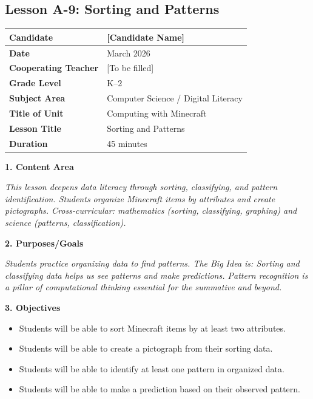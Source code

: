 \documentclass[11pt,letterpaper]{article}
\begin{document}
\newpage
\subsection{Lesson A-9: Sorting and Patterns}
\label{sub:LessonA9SortingandPatterns}

\begin{longtable}{|L{0.28\textwidth}|L{0.65\textwidth}|}
\hline
\textbf{Candidate}  & [Candidate Name]  \\
\hline
\textbf{Date}  & March 2026  \\
\hline
\textbf{Cooperating Teacher}  & [To be filled]  \\
\hline
\textbf{Grade Level}  & K--2  \\
\hline
\textbf{Subject Area}  & Computer Science / Digital Literacy  \\
\hline
\textbf{Title of Unit}  & Computing with Minecraft  \\
\hline
\textbf{Lesson Title}  & Sorting and Patterns  \\
\hline
\textbf{Duration}  & 45 minutes  \\
\hline
\end{longtable}

\textbf{1. Content Area}

\textit{This lesson deepens data literacy through sorting, classifying, and pattern identification. Students organize Minecraft items by attributes and create pictographs. Cross-curricular: mathematics (sorting, classifying, graphing) and science (patterns, classification).}

\textbf{2. Purposes/Goals}

\textit{Students practice organizing data to find patterns. The Big Idea is: Sorting and classifying data helps us see patterns and make predictions. Pattern recognition is a pillar of computational thinking essential for the summative and beyond.}

\textbf{3. Objectives}

\begin{itemize}
  \item Students will be able to sort Minecraft items by at least two attributes.

  \item Students will be able to create a pictograph from their sorting data.

  \item Students will be able to identify at least one pattern in organized data.

  \item Students will be able to make a prediction based on their observed pattern.
\end{itemize}
\end{document}
